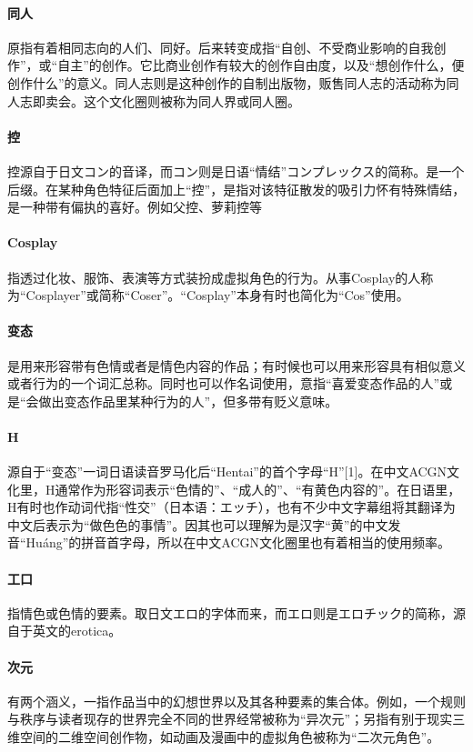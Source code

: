 \documentclass[UTF8,12pt]{ctexart}
\begin{document}
\paragraph{同人}原指有着相同志向的人们、同好。后来转变成指“自创、不受商业影响的自我创作”，或“自主”的创作。它比商业创作有较大的创作自由度，以及“想创作什么，便创作什么”的意义。同人志则是这种创作的自制出版物，贩售同人志的活动称为同人志即卖会。这个文化圈则被称为同人界或同人圈。
\paragraph{控}控源自于日文コン的音译，而コン则是日语“情结”コンプレックス的简称。是一个后缀。在某种角色特征后面加上“控”，是指对该特征散发的吸引力怀有特殊情结，是一种带有偏执的喜好。例如父控、萝莉控等
\paragraph{Cosplay}指透过化妆、服饰、表演等方式装扮成虚拟角色的行为。从事Cosplay的人称为“Cosplayer”或简称“Coser”。“Cosplay”本身有时也简化为“Cos”使用。
\paragraph{变态}是用来形容带有色情或者是情色内容的作品；有时候也可以用来形容具有相似意义或者行为的一个词汇总称。同时也可以作名词使用，意指“喜爱变态作品的人”或是“会做出变态作品里某种行为的人”，但多带有贬义意味。
\paragraph{H}源自于“变态”一词日语读音罗马化后“Hentai”的首个字母“H”[1]。在中文ACGN文化里，H通常作为形容词表示“色情的”、“成人的”、“有黄色内容的”。在日语里，H有时也作动词代指“性交”（日本语：エッチ），也有不少中文字幕组将其翻译为中文后表示为“做色色的事情”。因其也可以理解为是汉字“黄”的中文发音“Huáng”的拼音首字母，所以在中文ACGN文化圈里也有着相当的使用频率。
\paragraph{工口}指情色或色情的要素。取日文エロ的字体而来，而エロ则是エロチック的简称，源自于英文的erotica。
\paragraph{次元}有两个涵义，一指作品当中的幻想世界以及其各种要素的集合体。例如，一个规则与秩序与读者现存的世界完全不同的世界经常被称为“异次元”；另指有别于现实三维空间的二维空间创作物，如动画及漫画中的虚拟角色被称为“二次元角色”。
\end{document}
